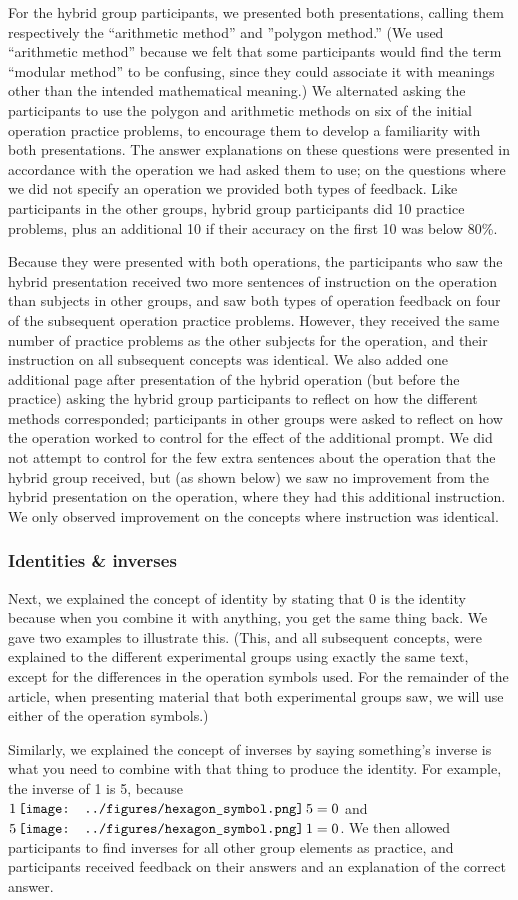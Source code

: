 \documentclass[man,10pt]{apa6}
\newcommand{\hex}{\,\vcenter{\hbox{\texttt{[image: ../figures/hexagon\_symbol.png]}}}\,}
\begin{document}
For the hybrid group participants, we presented both presentations, calling them respectively the ``arithmetic method'' and ''polygon method.'' (We used ``arithmetic method'' because we felt that some participants would find the term ``modular method'' to be confusing, since they could associate it with meanings other than the intended mathematical meaning.) We alternated asking the participants to use the polygon and arithmetic methods on six of the initial operation practice problems, to encourage them to develop a familiarity with both presentations. The answer explanations on these questions were presented in accordance with the operation we had asked them to use; on the questions where we did not specify an operation we provided both types of feedback. Like participants in the other groups, hybrid group participants did 10 practice problems, plus an additional 10 if their accuracy on the first 10 was below 80\%. \par
Because they were presented with both operations, the participants who saw the hybrid presentation received two more sentences of instruction on the operation than subjects in other groups, and saw both types of operation feedback on four of the subsequent operation practice problems. However, they received the same number of practice problems as the other subjects for the operation, and their instruction on all subsequent concepts was identical. We also added one additional page after presentation of the hybrid operation (but before the practice) asking the hybrid group participants to reflect on how the different methods corresponded; participants in other groups were asked to reflect on how the operation worked to control for the effect of the additional prompt. We did not attempt to control for the few extra sentences about the operation that the hybrid group received, but (as shown below) we saw no improvement from the hybrid presentation on the operation, where they had this additional instruction. We only observed improvement on the concepts where instruction was identical.\par 
\subsubsection{Identities \& inverses}
Next, we explained the concept of identity by stating that 0 is the identity because when you combine it with anything, you get the same thing back. We gave two examples to illustrate this. (This, and all subsequent concepts, were explained to the different experimental groups using exactly the same text, except for the differences in the operation symbols used. For the remainder of the article, when presenting material that both experimental groups saw, we will use either of the operation symbols.)\par
Similarly, we explained the concept of inverses by saying something's inverse is what you need to combine with that thing to produce the identity. For example, the inverse of 1 is 5, because $1 \hex 5 = 0$ and $5 \hex 1 = 0$. We then allowed participants to find inverses for all other group elements as practice, and participants received feedback on their answers and an explanation of the correct answer.
\end{document}
